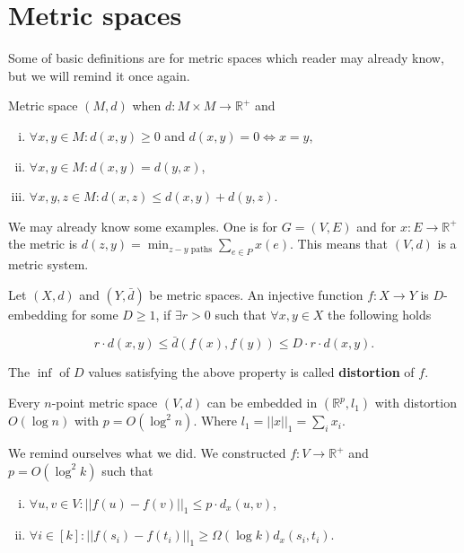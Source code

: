 \section{Metric spaces}

Some of basic definitions are for metric spaces which reader may already know, but we will remind it once again.

\begin{defn}
	Metric space $(M,d)$ when $d : M \times M \to \mathbb{R}^{+}$ and
	
	\begin{enumerate}[(i)]
		\item $\forall x,y \in M: d(x,y) \geq 0$ and $d(x,y) = 0 \Leftrightarrow x = y$,
		\item $\forall x,y \in M : d(x,y) = d(y,x)$,
		\item $\forall x,y,z \in M: d(x,z) \leq d(x,y) + d(y,z)$.
	\end{enumerate}
\end{defn}

We may already know some examples. One is for $G = (V,E)$ and for $x : E \to \mathbb{R}^{+}$ the metric is $d(z,y) = \min_{z-y \text{ paths}} \sum_{e \in P} x(e)$. This means that $(V,d)$ is a metric system.

\begin{defn}
	Let $(X,d)$ and $(Y,\bar{d})$ be metric spaces. An injective function $f : X \to Y$ is $D$-embedding for some $D \geq 1$, if $\exists r > 0$ such that $\forall x,y \in X$ the following holds
	
	$$
	r \cdot d(x,y) \leq \bar{d}(f(x), f(y)) \leq D \cdot r \cdot d(x,y).
	$$
\end{defn}

\begin{defn}
	The $\inf$ of $D$ values satisfying the above property is called \textbf{distortion} of $f$.
\end{defn}

\begin{thm}[Bourgain, 1985]
	Every $n$-point metric space $(V,d)$ can be embedded in $(\mathbb{R}^{p}, l_{1})$ with distortion $O(\log n)$ with $p = O(\log ^{2} n)$. Where $l_{1} = ||x||_{1} = \sum_{i}x_{i}$.
\end{thm}

We remind ourselves what we did. We constructed $f : V \to \mathbb{R}^{+}$ and $p = O(\log^{2} k)$ such that

\begin{enumerate}[(i)]
	\item $\forall u,v \in V : ||f(u) - f(v)||_{1} \leq p \cdot d_{x}(u,v)$,
	\item $\forall i \in [k] : ||f(s_{i}) - f(t_{i})||_{1} \geq \Omega(\log k) d_{x}(s_{i}, t_{i})$.
\end{enumerate}

